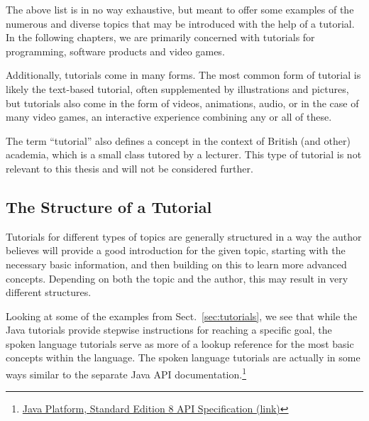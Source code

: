 \noindent
The above list is in no way exhaustive, but meant to offer some examples of the numerous and diverse topics that may be introduced with the help of a tutorial. In the following chapters, we are primarily concerned with tutorials for programming, software products and video games.

\noindent
Additionally, tutorials come in many forms. The most common form of tutorial is likely the text-based tutorial, often supplemented by illustrations and pictures, but tutorials also come in the form of videos, animations, audio, or in the case of many video games, an interactive experience combining any or all of these.

\noindent
The term ``tutorial'' also defines a concept in the context of British (and other) academia, which is a small class tutored by a lecturer. This type of tutorial is not relevant to this thesis and will not be considered further.

\subsection{The Structure of a Tutorial}
\label{sec:tutorial_structure}
Tutorials for different types of topics are generally structured in a way the author believes will provide a good introduction for the given topic, starting with the necessary basic information, and then building on this to learn more advanced concepts. Depending on both the topic and the author, this may result in very different structures.

\noindent
Looking at some of the examples from Sect.~\ref{sec:tutorials}, we see that while the Java tutorials provide stepwise instructions for reaching a specific goal, the spoken language tutorials serve as more of a lookup reference for the most basic concepts within the language. The spoken language tutorials are actually in some ways similar to the separate Java API documentation.\footnote{\href{http://docs.oracle.com/javase/8/docs/api/index.html}{Java Platform, Standard Edition 8
API Specification (link)}}

